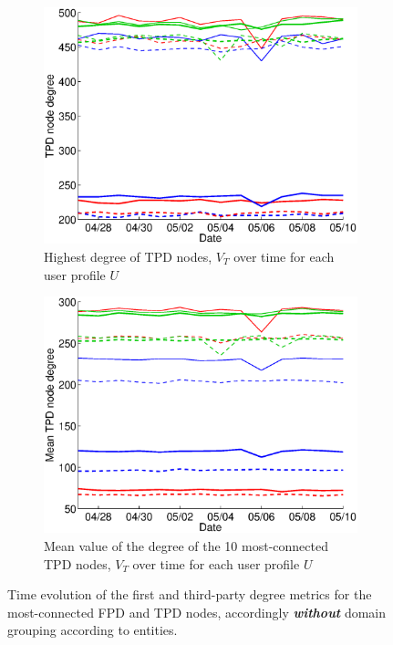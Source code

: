 \documentclass{sig-alternate}
\begin{document}
\begin{figure}
\begin{subfigure}{.38\textwidth}
  \end{subfigure}
  \begin{subfigure}{.38\textwidth}
    \includegraphics[width=\textwidth]{figures/plots/third-mean-top1.eps}
    \caption{Highest degree of TPD nodes, $V_T$ over time for each user profile $U$}
    \label{fig:third_mean_top1_without_entities}
  \end{subfigure}
  \begin{subfigure}{.38\textwidth}
    \includegraphics[width=\textwidth]{figures/plots/third-mean-top10.eps}
    \caption{Mean value of the degree of the 10 most-connected TPD nodes, $V_T$ over time for each user profile $U$}
    \label{fig:third_mean_top10_without_entities}
  \end{subfigure}

  \caption{Time evolution of the first and third-party degree metrics for the most-connected FPD and TPD nodes, accordingly \textbf{\textit{without}} domain grouping according to entities.}
  \label{fig:highest_degree_nodes_without_entities}
  \end{figure}
\end{document}
